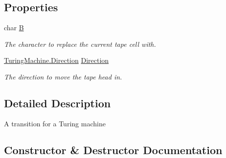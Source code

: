 \subsection*{Properties}
\begin{DoxyCompactItemize}
\item 
char \mbox{\hyperlink{class_system_1_1_automata_1_1_turing_transition_a1837a0ade7ba5eae701f731ec5fb6dc7}{B}}
\begin{DoxyCompactList}\small\item\em The character to replace the current tape cell with. \end{DoxyCompactList}\item 
\mbox{\hyperlink{class_system_1_1_automata_1_1_turing_machine_aa253c3820befa3cfdd3d17b2d8fdd2d9}{Turing\+Machine.\+Direction}} \mbox{\hyperlink{class_system_1_1_automata_1_1_turing_transition_af02531641bd2e8805ad322c253a34660}{Direction}}
\begin{DoxyCompactList}\small\item\em The direction to move the tape head in. \end{DoxyCompactList}\end{DoxyCompactItemize}


\subsection{Detailed Description}
A transition for a Turing machine 



\subsection{Constructor \& Destructor Documentation}
\mbox{\label{class_system_1_1_automata_1_1_turing_transition_a67564840226244a1f36666913d299469}} 
